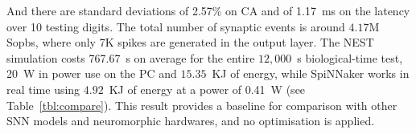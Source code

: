 And there are standard deviations of 2.57\% on CA and of 1.17~ms on the latency over 10 testing digits.
The total number of synaptic events is around $4.17$M Sopbs, where only 7K spikes are generated in the output layer. 
The NEST simulation costs 767.67~s on average for the entire $12,000$~s biological-time test, 20~W in power use on the PC and $15.35$~KJ of energy, while SpiNNaker works in real time using $4.92$~KJ of energy at a power of 0.41~W (see Table~\ref{tbl:compare}).
This result provides a baseline for comparison with other SNN models and neuromorphic hardwares, and no optimisation is applied.


